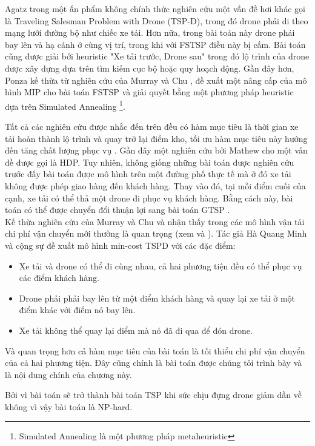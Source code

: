\documentclass[a4paper,12pt]{report}
\begin{document}
Agatz \cite{13} trong một ấn phẩm không chính thức nghiên cứu một vấn đề hơi khác gọi là Traveling Salesman Problem with Drone (TSP-D), trong đó drone phải di theo mạng lưới đường bộ như chiếc xe tải. Hơn nữa, trong bài toán này drone phải bay lên và hạ cánh ở cùng vị trí, trong khi với \ac{FSTSP} điều này bị cấm. Bài toán cũng  được giải bởi heuristic "Xe tải trước, Drone sau" trong đó lộ trình của drone được xây dựng dựa trên tìm kiếm cục bộ hoặc quy hoạch động. Gần đây hơn, Ponza \cite{14} kế thừa từ nghiên cứu của Murray và Chu \cite{12}, đề xuất một nâng cấp của mô hình \ac{MIP} cho bài toán \ac{FSTSP} và giải quyết bằng một phương pháp heuristic dựa trên Simulated Annealing \footnote{Simulated Annealing là một phương pháp metaheuristic}.

Tất cả các nghiên cứu được nhắc đến trên đều có hàm mục tiêu là thời gian xe tải hoàn thành lộ trình và quay trở lại điểm kho, tối ưu hàm mục tiêu này hướng đến tăng chất lượng phục vụ \cite{16}. Gần đây một nghiên cứu bởi Mathew \cite{19} cho một vấn đề được gọi là \ac{HDP}. Tuy nhiên, không giống những bài toán được nghiên cứu trước đấy bài toán được mô hình trên một đường phố thực tế mà ở đó xe tải không được phép giao hàng đến khách hàng. Thay vào đó, tại mỗi điểm cuối của cạnh, xe tải có thể thả một drone đi phục vụ khách hàng. Bằng cách này, bài toán có thể được chuyển đổi thuận lợi sang bài toán  \ac{GTSP} \cite{21}.\\

Kế thừa nghiên cứu của Murray và Chu \cite{12} và nhận thấy trong các mô hình vận tải chi phí vận chuyển mới thường là quan trọng (xem \cite{17} và \cite{18}). Tác giả Hà Quang Minh và cộng sự đề xuất mô hình min-cost TSPD \cite{main} với các đặc điểm: \begin{itemize}
\item Xe tải và drone có thể đi cùng nhau, cả hai phương tiện đều có thể phục vụ các điểm khách hàng.
\item Drone phải phải bay lên từ một điểm khách hàng và quay lại xe tải ở một điểm khác với điểm nó bay lên.
\item Xe tải không thể quay lại điểm mà nó đã đi qua để đón drone.
\end{itemize}
Và quan trọng hơn cả hàm mục tiêu của bài toán là tối thiểu chi phí vận chuyển của cả hai phương tiện. Đây cũng chính là bài toán được chúng tôi trình bày và là nội dung chính của chương này. 

Bởi vì bài toán sẽ trở thành bài toán TSP khi sức chịu đựng drone giảm dần về không vì vậy bài toán là NP-hard. 
\end{document}
